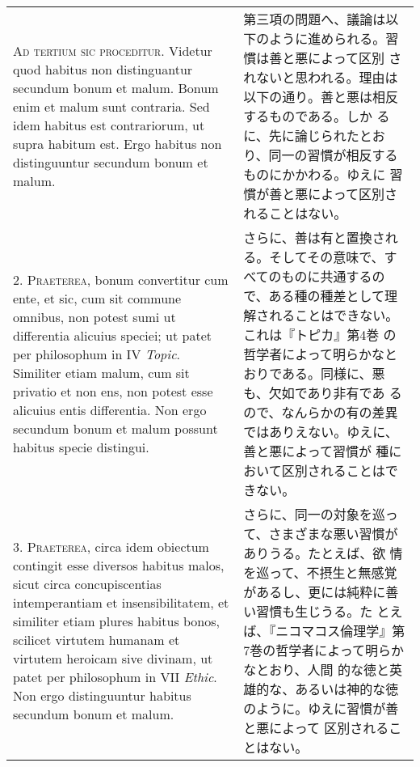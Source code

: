 \documentclass[10pt]{jsarticle} %
\begin{document}
\begin{longtable}{p{21em}p{21em}}


{\scshape Ad tertium sic proceditur}. Videtur quod habitus non
distinguantur secundum bonum et malum. Bonum enim et malum sunt
contraria. Sed idem habitus est contrariorum, ut supra habitum
est. Ergo habitus non distinguuntur secundum bonum et malum.

&

第三項の問題へ、議論は以下のように進められる。習慣は善と悪によって区別
されないと思われる。理由は以下の通り。善と悪は相反するものである。しか
るに、先に論じられたとおり、同一の習慣が相反するものにかかわる。ゆえに
習慣が善と悪によって区別されることはない。

\\



2. {\scshape Praeterea}, bonum convertitur cum ente, et sic, cum sit
commune omnibus, non potest sumi ut differentia alicuius speciei; ut
patet per philosophum in IV {\itshape Topic}. Similiter etiam malum,
cum sit privatio et non ens, non potest esse alicuius entis
differentia. Non ergo secundum bonum et malum possunt habitus specie
distingui.

&

さらに、善は有と置換される。そしてその意味で、すべてのものに共通するの
で、ある種の種差として理解されることはできない。これは『トピカ』第4巻
の哲学者によって明らかなとおりである。同様に、悪も、欠如であり非有であ
るので、なんらかの有の差異ではありえない。ゆえに、善と悪によって習慣が
種において区別されることはできない。

\\



3. {\scshape Praeterea}, circa idem obiectum contingit esse diversos
habitus malos, sicut circa concupiscentias intemperantiam et
insensibilitatem, et similiter etiam plures habitus bonos, scilicet
virtutem humanam et virtutem heroicam sive divinam, ut patet per
philosophum in VII {\itshape Ethic}. Non ergo distinguuntur habitus
secundum bonum et malum.

&

さらに、同一の対象を巡って、さまざまな悪い習慣がありうる。たとえば、欲
情を巡って、不摂生と無感覚があるし、更には純粋に善い習慣も生じうる。た
とえば、『ニコマコス倫理学』第7巻の哲学者によって明らかなとおり、人間
的な徳と英雄的な、あるいは神的な徳のように。ゆえに習慣が善と悪によって
区別されることはない。

\\




\end{longtable}
\end{document}
